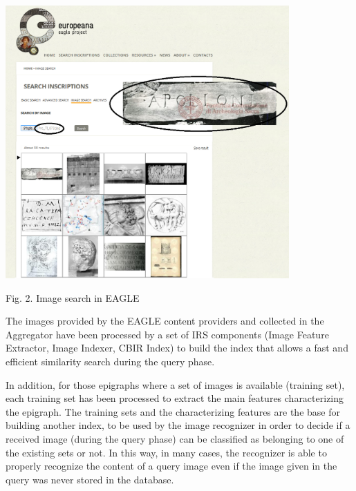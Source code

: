 \documentclass[amsthm,ebook]{saparticle}
\begin{document}
 \includegraphics[width=10.848cm,height=10.451cm]{EAGLE2016submissionXX-img002.png} 

Fig. 2. Image search in EAGLE


\bigskip

The images provided by the EAGLE content providers and collected in the Aggregator have been processed by a set of IRS
components (Image Feature Extractor, Image Indexer, CBIR Index) to build the index that allows a fast and efficient
similarity search during the query phase.

In addition, for those epigraphs where a set of images is available (training set), each training set has been processed
to extract the main features characterizing the epigraph. The training sets and the characterizing features are the
base for building another index, to be used by the image recognizer in order to decide if a received image (during the
query phase) can be classified as belonging to one of the existing sets or not. In this way, in many cases, the
recognizer is able to properly recognize the content of a query image even if the image given in the query was never
stored in the database.


\bigskip
\end{document}
